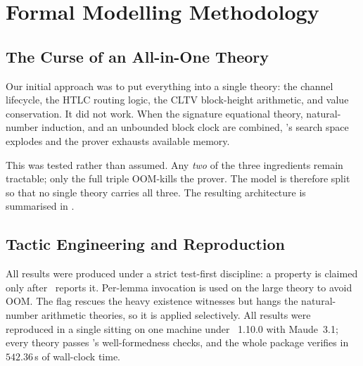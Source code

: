 \section{Formal Modelling Methodology}

\subsection{The Curse of an All-in-One Theory}

Our initial approach was to put everything into a single theory: the channel
lifecycle, the HTLC routing logic, the CLTV block-height arithmetic, and value
conservation. It did not work. When the signature equational theory,
natural-number induction, and an unbounded block clock are combined,
\mtamarin's search space explodes and the prover exhausts available memory.

This was tested rather than assumed. Any \emph{two} of the three ingredients
remain tractable; only the full triple OOM-kills the prover. The model is
therefore split so that no single theory carries all three. The resulting
architecture is summarised in .

\subsection{Tactic Engineering and Reproduction}

All results were produced under a strict test-first discipline: a property is
claimed only after \mtamarin\ reports it. Per-lemma invocation is used on the
large theory to avoid OOM. The flag  rescues the
heavy existence witnesses but hangs the natural-number arithmetic theories, so
it is applied selectively. All results were reproduced in a single sitting on
one machine under \mtamarin~1.10.0 with Maude~3.1; every theory passes
\mtamarin's well-formedness checks, and the whole package verifies in
$542.36$\,s of wall-clock time.

